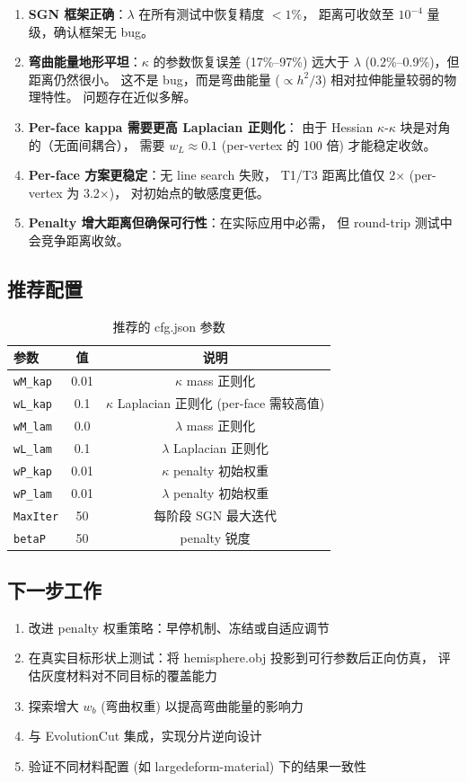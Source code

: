 \documentclass[12pt,a4paper]{article}
\begin{document}
\begin{enumerate}
    \item \textbf{SGN 框架正确}：$\lambda$ 在所有测试中恢复精度 $< 1\%$，
    距离可收敛至 $10^{-4}$ 量级，确认框架无 bug。

    \item \textbf{弯曲能量地形平坦}：$\kappa$ 的参数恢复误差 (17\%--97\%)
    远大于 $\lambda$ (0.2\%--0.9\%)，但距离仍然很小。
    这不是 bug，而是弯曲能量 ($\propto h^2/3$) 相对拉伸能量较弱的物理特性。
    问题存在近似多解。

    \item \textbf{Per-face kappa 需要更高 Laplacian 正则化}：
    由于 Hessian $\kappa$-$\kappa$ 块是对角的（无面间耦合），
    需要 $w_L \approx 0.1$ (per-vertex 的 100 倍) 才能稳定收敛。

    \item \textbf{Per-face 方案更稳定}：无 line search 失败，
    T1/T3 距离比值仅 2$\times$ (per-vertex 为 3.2$\times$)，
    对初始点的敏感度更低。

    \item \textbf{Penalty 增大距离但确保可行性}：在实际应用中必需，
    但 round-trip 测试中会竞争距离收敛。
\end{enumerate}

\subsection{推荐配置}

\begin{table}[H]
\centering
\caption{推荐的 cfg.json 参数}
\begin{tabular}{lcc}
\toprule
参数 & 值 & 说明 \\
\midrule
\texttt{wM\_kap} & 0.01 & $\kappa$ mass 正则化 \\
\texttt{wL\_kap} & 0.1 & $\kappa$ Laplacian 正则化 (per-face 需较高值) \\
\texttt{wM\_lam} & 0.0 & $\lambda$ mass 正则化 \\
\texttt{wL\_lam} & 0.1 & $\lambda$ Laplacian 正则化 \\
\texttt{wP\_kap} & 0.01 & $\kappa$ penalty 初始权重 \\
\texttt{wP\_lam} & 0.01 & $\lambda$ penalty 初始权重 \\
\texttt{MaxIter} & 50 & 每阶段 SGN 最大迭代 \\
\texttt{betaP} & 50 & penalty 锐度 \\
\bottomrule
\end{tabular}
\end{table}

\subsection{下一步工作}

\begin{enumerate}
    \item 改进 penalty 权重策略：早停机制、冻结或自适应调节
    \item 在真实目标形状上测试：将 hemisphere.obj 投影到可行参数后正向仿真，
    评估灰度材料对不同目标的覆盖能力
    \item 探索增大 $w_b$ (弯曲权重) 以提高弯曲能量的影响力
    \item 与 EvolutionCut 集成，实现分片逆向设计
    \item 验证不同材料配置 (如 largedeform-material) 下的结果一致性
\end{enumerate}
\end{document}
